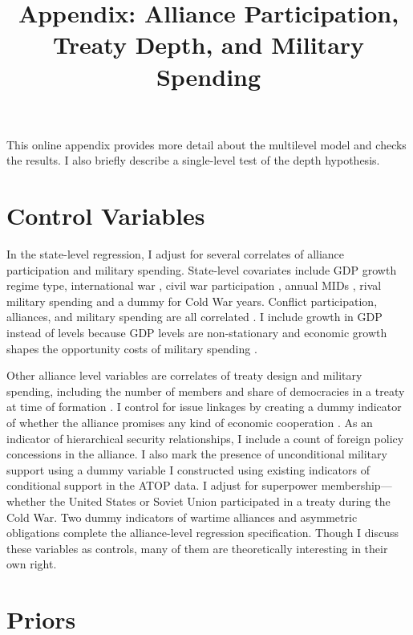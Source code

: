 \documentclass[12pt]{article}
\title{\textbf{Appendix: Alliance Participation, Treaty Depth, and Military Spending}}
\date{}
\begin{document}
\maketitle 

\doublespace 

This online appendix provides more detail about the multilevel model and checks the results. I also briefly describe a single-level test of the depth hypothesis. 


\section*{Control Variables} 


In the state-level regression, I adjust for several correlates of alliance participation and military spending. 
State-level covariates include GDP growth \citep{Boltetal2018} regime type, international war \citep{Reiteretal2016}, civil war participation \citep{SarkeesWayman2010}, annual MIDs \citep{Gibleretal2016}, rival military spending \citep{ThompsonDreyer2012} and a dummy for Cold War years.
Conflict participation, alliances, and military spending are all correlated \citep{SeneseVasquez2008}.
I include growth in GDP instead of levels because GDP levels are non-stationary and economic growth shapes the opportunity costs of military spending \citep{Kimball2010, Zielinskietal2017}.  

 
Other alliance level variables are correlates of treaty design and military spending, including the number of members and share of democracies in a treaty at time of formation \citep{Chibaetal2015}. 
I control for issue linkages by creating a dummy indicator of whether the alliance promises any kind of economic cooperation \citep{Poast2013, LongLeeds2006}. 
As an indicator of hierarchical security relationships, I include a count of foreign policy concessions in the alliance. 
I also mark the presence of unconditional military support using a dummy variable I constructed using existing indicators of conditional support in the ATOP data. 
I adjust for superpower membership--- whether the United States or Soviet Union participated in a treaty during the Cold War. 
Two dummy indicators of wartime alliances and asymmetric obligations \citep{Leedsetal2002} complete the alliance-level regression specification. 
Though I discuss these variables as controls, many of them are theoretically interesting in their own right. 


\section*{Priors}
\end{document}
